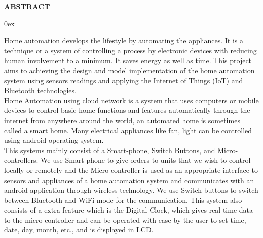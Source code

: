 \documentclass[11pt,a4paper]{article}
\begin{document}


\begin{center}

\vspace*{1cm}
\Large{\bfseries{ABSTRACT}}\\
\vspace*{1cm}

\end{center}
\parindent 0ex %

Home automation develops the lifestyle by automating the appliances. It is a technique or a system of controlling a process by electronic devices with reducing human involvement to a minimum.  It saves energy as well as time. This project aims to achieving the design and model implementation of the home automation system using sensors readings and applying the Internet of Things
(IoT) and Bluetooth technologies.\\

Home Automation using cloud network is a system that uses computers or mobile devices to control basic home functions and features automatically through the internet from anywhere around the world, an automated home is sometimes called a \uline{smart home}. Many electrical appliances like fan, light can be controlled using android operating system.\\

This systems mainly consist of a Smart-phone, Switch Buttons, and Micro-controllers. We use Smart phone to give orders to units that we wish to control locally or remotely and the Micro-controller is used as an appropriate interface to sensors and appliances of a home automation system and communicates with an android application through wireless technology. We use Switch buttons to switch between Bluetooth and WiFi mode for the communication. This system also consists of a extra feature which is the Digital Clock, which gives real time data to the micro-controller and can be operated with ease by the user to set time, date, day, month, etc., and is displayed in LCD. 

\thispagestyle{empty} %
\clearpage %
\newpage
\end{document}
